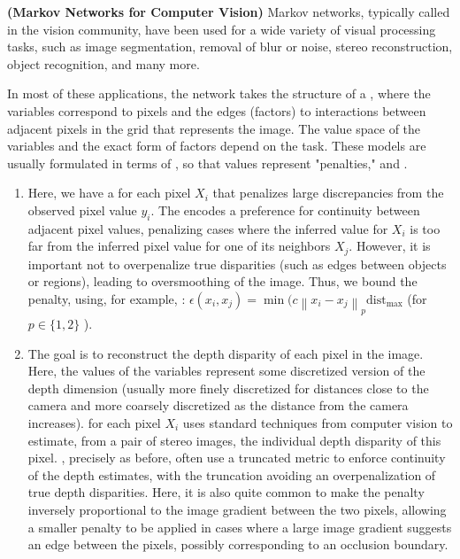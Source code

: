\documentclass{article}
\newcommand{\bfs}[1]{\textbf{({#1}) }}
\begin{document}
\begin{exma}\bfs{Markov Networks for Computer Vision}\label{ex:mdfe}
Markov networks, typically called  in the vision community, have been used for a wide variety of visual processing tasks, such as image segmentation, removal of blur or noise, stereo reconstruction, object recognition, and many more.

In most of these applications, the network takes the structure of a , where the variables correspond to pixels and the edges (factors) to interactions between adjacent pixels in the grid that represents the image. The value space of the variables and the exact form of factors depend on the task. These models are usually formulated in terms of , so that values represent "penalties," and .
\begin{enumerate}
    \item {}  Here, we have a  for each pixel $X_{i}$ that penalizes large discrepancies from the observed pixel value $y_{i}$. The  encodes a preference for continuity between adjacent pixel values, penalizing cases where the inferred value for $X_{i}$ is too 
    far from the inferred pixel value for one of its neighbors $X_{j}$. However, it is important not to overpenalize true disparities (such as edges between objects or regions), leading to oversmoothing of the image. Thus, we bound the penalty, using, for example, : $\epsilon\left(x_{i}, x_{j}\right)=\min (c\left\|x_{i}-x_{j}\right\|_{p}\mathrm{dist}_{\max }$ (for $p \in\{1,2\}$ ).
\item {}
The goal is to reconstruct the depth disparity of each pixel in the image. Here, the values of the variables represent some discretized version of the depth dimension (usually more finely discretized for distances close to the camera and more coarsely discretized as the distance from the camera increases).  for each pixel $X_{i}$ uses standard techniques from computer vision to estimate, from a pair of stereo images, the individual depth disparity of this pixel. , precisely as before, often use a {truncated metric to enforce continuity of the depth estimates}, with the truncation avoiding an overpenalization of true depth disparities. Here, it is also quite common to make the penalty inversely proportional to the image gradient between the two pixels, allowing a smaller penalty to be applied in cases where a large image gradient suggests an edge between the pixels, possibly corresponding to an occlusion boundary.

\end{enumerate}
\end{exma}
\end{document}
